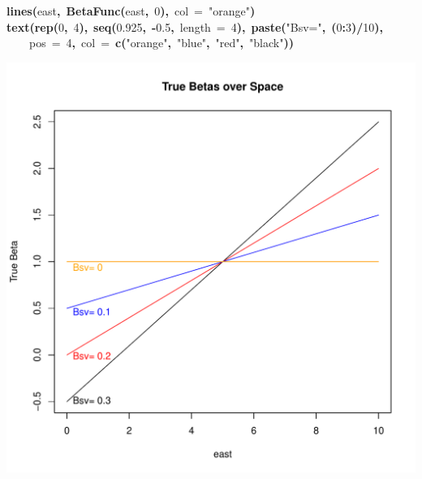 \documentclass{article}
\makeatletter
\newcommand{\hlnumber}[1]{\textcolor[rgb]{0,0,0}{#1}}%
\newcommand{\hlfunctioncall}[1]{\textcolor[rgb]{0.501960784313725,0,0.329411764705882}{\textbf{#1}}}%
\newcommand{\hlstring}[1]{\textcolor[rgb]{0.6,0.6,1}{#1}}%
\newcommand{\hlkeyword}[1]{\textcolor[rgb]{0,0,0}{\textbf{#1}}}%
\newcommand{\hlargument}[1]{\textcolor[rgb]{0.690196078431373,0.250980392156863,0.0196078431372549}{#1}}%
\newcommand{\hlsymbol}[1]{\textcolor[rgb]{0,0,0}{#1}}%
\newcommand{\hlstd}[1]{\textcolor[rgb]{0,0,0}{#1}}%
\newenvironment{kframe}{%
 \def\FrameCommand##1{\hskip\@totalleftmargin \hskip-\fboxsep
 \colorbox{shadecolor}{##1}\hskip-\fboxsep
     \hskip-\linewidth \hskip-\@totalleftmargin \hskip\columnwidth}%
 \MakeFramed {\advance\hsize-\width
   \@totalleftmargin\z@ \linewidth\hsize
   \@setminipage}}%
 {\par\unskip\endMakeFramed}
\newenvironment{knitrout}{}{} %
\makeatother
\begin{document}
\begin{knitrout}
\begin{kframe}
\begin{flushleft}
\hlstd{}\hlfunctioncall{lines}\hlkeyword{(}\hlsymbol{east}\hlkeyword{,}{\ }\hlfunctioncall{BetaFunc}\hlkeyword{(}\hlsymbol{east}\hlkeyword{,}{\ }\hlnumber{0}\hlkeyword{)}\hlkeyword{,}{\ }\hlargument{col}{\ }\hlargument{=}{\ }\hlstring{"{}orange"{}}\hlkeyword{)}\hspace*{\fill}\\
\hlstd{}\hlfunctioncall{text}\hlkeyword{(}\hlfunctioncall{rep}\hlkeyword{(}\hlnumber{0}\hlkeyword{,}{\ }\hlnumber{4}\hlkeyword{)}\hlkeyword{,}{\ }\hlfunctioncall{seq}\hlkeyword{(}\hlnumber{0.925}\hlkeyword{,}{\ }\hlkeyword{-}\hlnumber{0.5}\hlkeyword{,}{\ }\hlargument{length}{\ }\hlargument{=}{\ }\hlnumber{4}\hlkeyword{)}\hlkeyword{,}{\ }\hlfunctioncall{paste}\hlkeyword{(}\hlstring{"{}Bsv="{}}\hlkeyword{,}{\ }\hlkeyword{(}\hlnumber{0}\hlkeyword{:}\hlnumber{3}\hlkeyword{)}\hlkeyword{/}\hlnumber{10}\hlkeyword{)}\hlkeyword{,}\hspace*{\fill}\\
\hlstd{}{\ }{\ }{\ }{\ }\hlargument{pos}{\ }\hlargument{=}{\ }\hlnumber{4}\hlkeyword{,}{\ }\hlargument{col}{\ }\hlargument{=}{\ }\hlfunctioncall{c}\hlkeyword{(}\hlstring{"{}orange"{}}\hlkeyword{,}{\ }\hlstring{"{}blue"{}}\hlkeyword{,}{\ }\hlstring{"{}red"{}}\hlkeyword{,}{\ }\hlstring{"{}black"{}}\hlkeyword{)}\hlkeyword{)}\mbox{}
\normalfont
\end{flushleft}
\end{kframe}\includegraphics{figure/unnamed-chunk-4} 
\end{knitrout}
\end{document}
